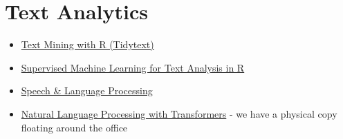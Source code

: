 \documentclass[
  letterpaper,
  DIV=11,
  numbers=noendperiod]{scrreprt}
\providecommand{\tightlist}{%
  \setlength{\itemsep}{0pt}\setlength{\parskip}{0pt}}\usepackage{longtable,booktabs,array}
\begin{document}
\section{Text Analytics}\label{text-analytics}

\begin{itemize}
\tightlist
\item
  \href{https://www.tidytextmining.com/}{Text Mining with R (Tidytext)}
\item
  \href{https://smltar.com/}{Supervised Machine Learning for Text
  Analysis in R}
\item
  \href{https://web.stanford.edu/~jurafsky/slp3/ed3book.pdf}{Speech \&
  Language Processing}
\item
  \href{https://github.com/nlp-with-transformers/notebooks}{Natural
  Language Processing with Transformers} - we have a physical copy
  floating around the office
\end{itemize}
\end{document}
